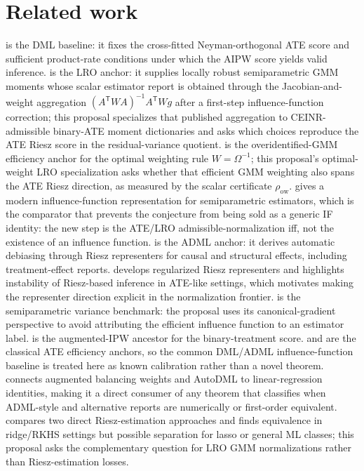 \documentclass[11pt]{article}
\newcommand{\transpose}{\mathsf{T}}
\theoremstyle{definition}
\theoremstyle{plain}
\theoremstyle{remark}
\begin{document}
\section{Related work}
\citet{ChernozhukovEtAl2018ECTJ} is the DML baseline: it fixes the cross-fitted Neyman-orthogonal ATE score and sufficient product-rate conditions under which the AIPW score yields valid inference.  \citet{ChernozhukovEscancianoIchimuraNeweyRobins2022LRO} is the LRO anchor: it supplies locally robust semiparametric GMM moments whose scalar estimator report is obtained through the Jacobian-and-weight aggregation $(A^\transpose W A)^{-1}A^\transpose Wg$ after a first-step influence-function correction; this proposal specializes that published aggregation to CEINR-admissible binary-ATE moment dictionaries and asks which choices reproduce the ATE Riesz score in the residual-variance quotient.  \citet{Hansen1982Econometrica} is the overidentified-GMM efficiency anchor for the optimal weighting rule $W=\Omega^{-1}$; this proposal's optimal-weight LRO specialization asks whether that efficient GMM weighting also spans the ATE Riesz direction, as measured by the scalar certificate $\rho_{\mathrm{ow}}$.  \citet{IchimuraNewey2022QE} gives a modern influence-function representation for semiparametric estimators, which is the comparator that prevents the conjecture from being sold as a generic IF identity: the new step is the ATE/LRO admissible-normalization iff, not the existence of an influence function.  \citet{ChernozhukovNeweySingh2022ADML} is the ADML anchor: it derives automatic debiasing through Riesz representers for causal and structural effects, including treatment-effect reports.  \citet{ChernozhukovNeweySingh2022RR} develops regularized Riesz representers and highlights instability of Riesz-based inference in ATE-like settings, which motivates making the representer direction explicit in the normalization frontier.  \citet{Newey1994Econometrica} is the semiparametric variance benchmark: the proposal uses its canonical-gradient perspective to avoid attributing the efficient influence function to an estimator label.  \citet{RobinsRotnitzkyZhao1994JASA} is the augmented-IPW ancestor for the binary-treatment score.  \citet{Hahn1998Econometrica} and \citet{HiranoImbensRidder2003Econometrica} are the classical ATE efficiency anchors, so the common DML/ADML influence-function baseline is treated here as known calibration rather than a novel theorem.  \citet{BrunsSmithDukesFellerOgburn2025JRSSB} connects augmented balancing weights and AutoDML to linear-regression identities, making it a direct consumer of any theorem that classifies when ADML-style and alternative reports are numerically or first-order equivalent.  \citet{BrunsSmith2026RieszApproaches} compares two direct Riesz-estimation approaches and finds equivalence in ridge/RKHS settings but possible separation for lasso or general ML classes; this proposal asks the complementary question for LRO GMM normalizations rather than Riesz-estimation losses.
\end{document}
